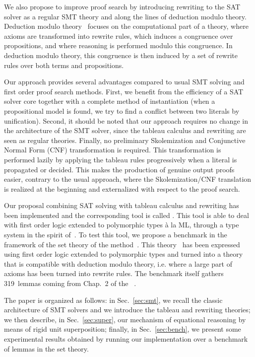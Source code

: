 We also propose to improve proof search by introducing rewriting to the SAT
solver as a regular SMT theory and along the lines of deduction modulo
theory. Deduction modulo theory~\cite{DA03} focuses on the computational part of
a theory, where axioms are transformed into rewrite rules, which induces a
congruence over propositions, and where reasoning is performed modulo this
congruence. In deduction modulo theory, this congruence is then induced by a set
of rewrite rules over both terms and propositions.

Our approach provides several advantages compared to usual SMT solving and first
order proof search methods. First, we benefit from the efficiency of a SAT
solver core together with a complete method of instantiation (when a
propositional model is found, we try to find a conflict between two literals by
unification). Second, it should be noted that our approach requires no change in
the architecture of the SMT solver, since the tableau calculus and rewriting are
seen as regular theories. Finally, no preliminary Skolemization and Conjunctive
Normal Form (CNF) transformation is required. This transformation is performed
lazily by applying the tableau rules progressively when a literal is propagated
or decided.  This makes the production of genuine output proofs easier, contrary
to the usual approach, where the Skolemization/CNF translation is realized at
the beginning and externalized with respect to the proof search.

Our proposal combining SAT solving with tableau calculus and rewriting has been
implemented and the corresponding tool is called \archsat{}. This tool is able
to deal with first order logic extended to polymorphic types à la ML, through a
type system in the spirit of~\cite{BP13}. To test this tool, we propose a
benchmark in the framework of the set theory of the \bmth{}
method~\cite{B-Book}. This theory~\cite{BA15} has been expressed using first
order logic extended to polymorphic types and turned into a theory that is
compatible with deduction modulo theory, i.e. where a large part of axioms has
been turned into rewrite rules. The benchmark itself gathers 319~lemmas coming
from Chap.~2 of the \bbook{}~\cite{B-Book}.

The paper is organized as follows: in Sec.~\ref{sec:smt}, we recall the classic
architecture of SMT solvers and we introduce the tableau and rewriting theories;
we then describe, in Sec.~\ref{sec:super}, our mechanism of equational reasoning
by means of rigid unit superposition; finally, in Sec.~\ref{sec:bench}, we
present some experimental results obtained by running our implementation over a
benchmark of lemmas in the \bmth{} set theory.
